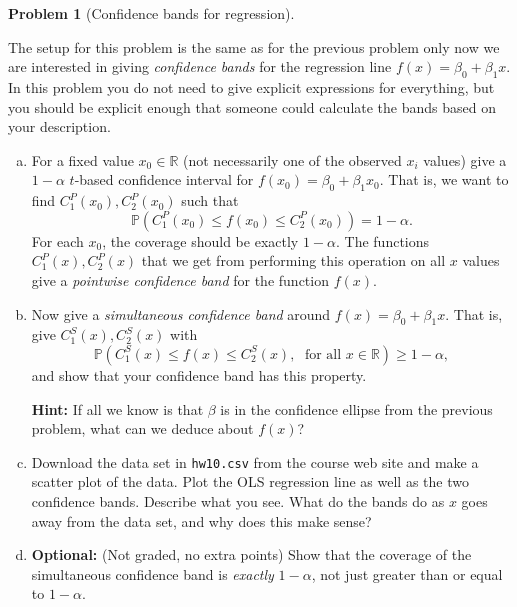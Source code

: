 \documentclass{article}
\newcommand{\PP}{\mathbb{P}}
\newcommand{\RR}{\mathbb{R}}
\newcommand{\optional}{{\bf Optional:} (Not graded, no extra points) }
\theoremstyle{definition}
\newtheorem{problem}{Problem}
\begin{document}
\begin{problem}[Confidence bands for regression]
\label{prob:conf-bands-regression}

The setup for this problem is the same as for the previous problem only now we are interested in giving {\em confidence bands} for the regression line $f(x) = \beta_0 + \beta_1 x$. In this problem you do not need to give explicit expressions for everything, but you should be explicit enough that someone could calculate the bands based on your description.

\begin{enumerate}[(a)]
\item For a fixed value $x_0 \in \RR$ (not necessarily one of the observed $x_i$ values) give a $1-\alpha$ $t$-based confidence interval for $f(x_0) = \beta_0 + \beta_1 x_0$. That is, we want to find $C_1^P(x_0), C_2^P(x_0)$ such that
\[
\PP\left(C_1^P(x_0) \leq f(x_0) \leq C_2^P(x_0)\right) = 1-\alpha.
\]
For each $x_0$, the coverage should be exactly $1-\alpha$. The functions $C_1^P(x), C_2^P(x)$ that we get from performing this operation on all $x$ values give a {\em pointwise confidence band} for the function $f(x)$.



\item Now give a {\em simultaneous confidence band} around $f(x) = \beta_0 + \beta_1 x$. That is, give $C_1^S(x), C_2^S(x)$ with
\[
\PP\left(C_1^S(x) \leq f(x) \leq C_2^S(x), \; \text{ for all } x\in\RR\right) \geq 1-\alpha,
\]
and show that your confidence band has this property.

{\bf Hint:} If all we know is that $\beta$ is in the confidence ellipse from the previous problem, what can we deduce about $f(x)$?



\item Download the data set in \texttt{hw10.csv} from the course web site and make a scatter plot of the data. Plot the OLS regression line as well as the two confidence bands. Describe what you see. What do the bands do as $x$ goes away from the data set, and why does this make sense?



\item \optional Show that the coverage of the simultaneous confidence band is {\em exactly} $1-\alpha$, not just greater than or equal to $1-\alpha$.



\end{enumerate}
\end{problem}
\end{document}
